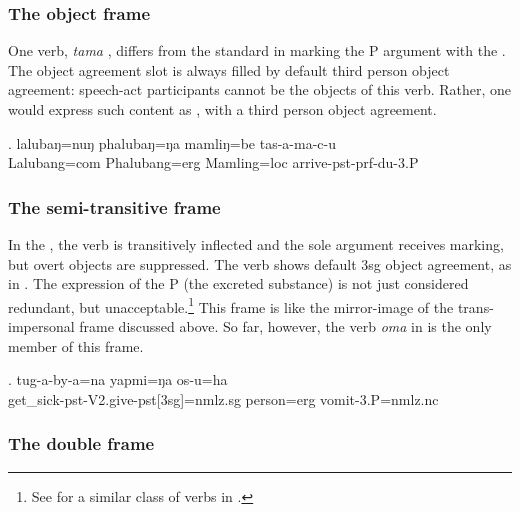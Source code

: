 \subsubsection{The  object frame}\label{tr-loc}


\noindent
One verb,  \emph{tama} , differs from the standard  in  marking the P argument with the  .  The object agreement slot is always filled by default third person object agreement: speech-act participants cannot be the objects of this verb. Rather, one would express  such content as , with a third person object agreement.

\exg. lalubaŋ=nuŋ   phalubaŋ=ŋa   mamliŋ=be   tas-a-ma-c-u\\
Lalubang{\sc =com} Phalubang{\sc =erg} Mamling{\sc =loc} arrive{\sc -pst-prf-du-3.P}\\
 
  
 

\subsubsection{The semi-transitive frame}\label{tr-semi}


\noindent
In the , the verb is transitively inflected and the sole argument receives  marking, but overt objects are suppressed. The verb shows default 3sg object agreement, as in \Next. The expression of the P (the excreted substance) is not just considered redundant, but unacceptable.\footnote{See  \citet[1480]{Li2007Splitergativity} for a similar class of verbs in .} This frame is like the mirror-image of the trans-impersonal frame discussed above. So far, however, the verb \emph{oma}  in \Next is the only member of this frame.

\exg. tug-a-by-a=na yapmi=ŋa os-u=ha\\
 get\_sick{\sc -pst-V2.give-pst[3sg]=nmlz.sg} person{\sc =erg} vomit{\sc -3.P=nmlz.nc}\\


\subsubsection{The double  frame}\label{itr-teach}

